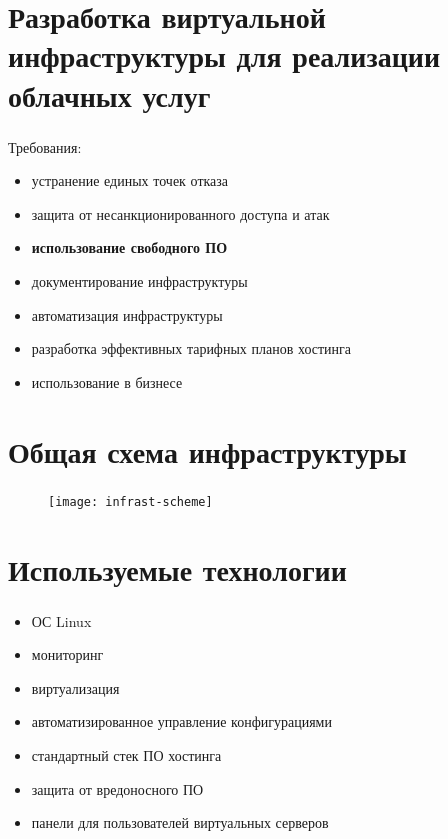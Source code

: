 
\frame[plain]{\titlepage} %


\section{Разработка виртуальной инфраструктуры для реализации облачных услуг}

\begin{frame}
\frametitle{\insertsection}
Требования:
\begin{itemize}
	\item устранение единых точек отказа
	\item защита от несанкционированного доступа и атак
	\item \textbf{использование свободного ПО}
	\item документирование инфраструктуры
	\item автоматизация инфраструктуры
	\item разработка эффективных тарифных планов хостинга
	\item использование в бизнесе
\end{itemize}
\end{frame}


\section{Общая схема инфраструктуры}

\begin{frame}
\frametitle{\insertsection}
\begin{figure}[h]
	\begin{center}
		\texttt{[image: infrast-scheme]}
	\end{center}
\end{figure}
\end{frame}


\section{Используемые технологии}

\begin{frame}
\frametitle{\insertsection}
\begin{itemize}
	\item ОС Linux
	\item мониторинг
	\item виртуализация
	\item автоматизированное управление конфигурациями
	\item стандартный стек ПО хостинга
	\item защита от вредоносного ПО
	\item панели для пользователей виртуальных серверов
\end{itemize}
\end{frame}


